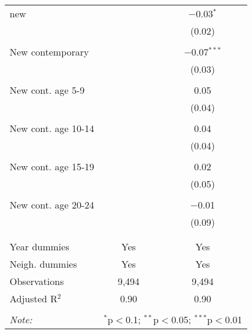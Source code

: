 \begin{table}[!htb]
\begin{tabular}{@{\extracolsep{5pt}}lcc}
 new &  & $-$0.03$^{*}$ \\ 
  &  & (0.02) \\ 
  & & \\ 
 New contemporary &  & $-$0.07$^{***}$ \\ 
  &  & (0.03) \\ 
  & & \\ 
 New cont. age 5-9 &  & 0.05 \\ 
  &  & (0.04) \\ 
  & & \\ 
 New cont. age 10-14 &  & 0.04 \\ 
  &  & (0.04) \\ 
  & & \\ 
 New cont. age 15-19 &  & 0.02 \\ 
  &  & (0.05) \\ 
  & & \\ 
 New cont. age 20-24 &  & $-$0.01 \\ 
  &  & (0.09) \\ 
  & & \\ 
\hline \\[-1.8ex] 
Year dummies & Yes & Yes \\ 
Neigh. dummies & Yes & Yes \\ 
Observations & 9,494 & 9,494 \\ 
Adjusted R$^{2}$ & 0.90 & 0.90 \\ 
\hline 
\hline \\[-1.8ex] 
\textit{Note:}  & \multicolumn{2}{r}{$^{*}$p$<$0.1; $^{**}$p$<$0.05; $^{***}$p$<$0.01} \\ 
\end{tabular} 
\end{table} 
